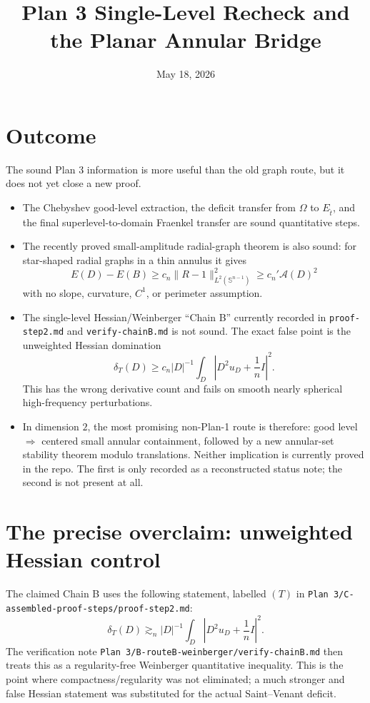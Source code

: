 \documentclass[11pt]{article}
\title{Plan 3 Single-Level Recheck and the Planar Annular Bridge}
\author{}
\date{May 18, 2026}
\newcommand{\Om}{\Omega}
\newcommand{\Sph}{\mathbb S}
\newcommand{\cA}{\mathcal A}
\begin{document}
\maketitle

\section{Outcome}

The sound Plan 3 information is more useful than the old graph route, but it
does not yet close a new proof.

\begin{itemize}
\item The Chebyshev good-level extraction, the deficit transfer
from \(\Om\) to \(E_{\hat t}\), and the final superlevel-to-domain
Fraenkel transfer are sound quantitative steps.
\item The recently proved small-amplitude radial-graph theorem is also sound:
for star-shaped radial graphs in a thin annulus it gives
\[
   E(D)-E(B)\ge c_n\|R-1\|_{L^2(\Sph^{n-1})}^2\ge c_n'\cA(D)^2
\]
with no slope, curvature, \(C^1\), or perimeter assumption.
\item The single-level Hessian/Weinberger ``Chain B'' currently recorded in
\texttt{proof-step2.md} and \texttt{verify-chainB.md} is not sound.  The
exact false point is the unweighted Hessian domination
\[
   \delta_T(D)\ge c_n |D|^{-1}\int_D \left|D^2u_D+\frac1n I\right|^2 .
\]
This has the wrong derivative count and fails on smooth nearly spherical
high-frequency perturbations.
\item In dimension \(2\), the most promising non-Plan-1 route is therefore:
good level \(\Rightarrow\) centered small annular containment, followed by a
new annular-set stability theorem modulo translations.  Neither implication
is currently proved in the repo.  The first is only recorded as a
reconstructed status note; the second is not present at all.
\end{itemize}

\section{The precise overclaim: unweighted Hessian control}

The claimed Chain B uses the following statement, labelled \((T)\) in
\texttt{Plan 3/C-assembled-proof-steps/proof-step2.md}:
\[
   \delta_T(D)\gtrsim_n |D|^{-1}\int_D
       \left|D^2u_D+\frac1n I\right|^2 .
   \tag{T}
\]
The verification note \texttt{Plan 3/B-routeB-weinberger/verify-chainB.md}
then treats this as a regularity-free Weinberger quantitative inequality.
This is the point where compactness/regularity was not eliminated; a much
stronger and false Hessian statement was substituted for the actual
Saint--Venant deficit.
\end{document}
